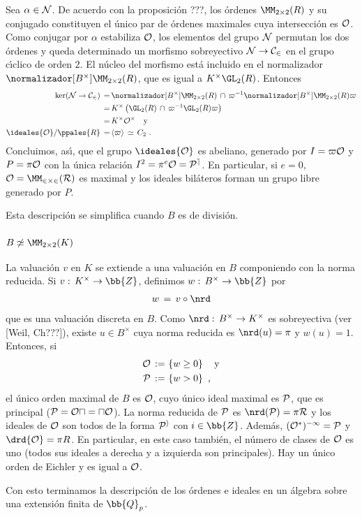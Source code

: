 Sea $\alpha\in\cal{N}$. De acuerdo con la proposici\'{o}n
???, los \'{o}rdenes $\MM_{2\times 2}(R)$ y su conjugado constituyen el
\'{u}nico par de \'{o}rdenes maximales cuya intersecci\'{o}n es $\cal{O}$.
Como conjugar por $\alpha$ estabiliza $\cal{O}$, los elementos del grupo
$\cal{N}$ permutan los dos \'{o}rdenes y queda determinado un morfismo
sobreyectivo $\cal{N}\rightarrow C_{2}$ en el grupo c\'{\i}clico de orden
$2$. El n\'{u}cleo del morfismo est\'{a} incluido en el normalizador
$\normalizador[B^{\times}]{\MM_{2\times 2}(R)}$, que es igual a
$K^{\times}\GL_{2}(R)$. Entonces
\begin{align*}
 \ker(\cal{N}\rightarrow C_{2}) \,=\, &
	\normalizador[B^{\times}]{\MM_{2\times 2}(R)}\,\cap\,
	\varpi^{-1}\normalizador[B^{\times}]{\MM_{2\times 2}(R)}\varpi \\
 \,=\, & K^{\times}
	\left(\GL_{2}(R)\,\cap\,\varpi^{-1}\GL_{2}(R)\varpi\right) \\
 \,=\, & K^{\times}\cal{O}^{\times}
	\quad\text{y} \\
	\ideales{\cal{O}}/\ppales{R}\,=\, & \langle\varpi\rangle\,\simeq\,
	C_{2}
	\text{ .}
\end{align*}
%
Concluimos, as\'{\i}, que el grupo $\ideales{\cal{O}}$ es abeliano,
generado por $I=\varpi\cal{O}$ y $P=\pi\cal{O}$ con la \'{u}nica relaci\'{o}n
$I^{2}=\pi^{e}\cal{O}=P^{e}$. En particular, si $e=0$,
$\cal{O}=\MM_{2\times 2}(R)$ es maximal y los ideales bil\'{a}teros
forman un grupo libre generado por $P$.

Esta descripci\'{o}n se simplifica cuando $B$ es de divisi\'{o}n.

\subsubsection{$B\not\simeq\MM_{2\times 2}(K)$}
La valuaci\'{o}n $v$ en $K$ se extiende a una valuaci\'{o}n en $B$
componiendo con la norma reducida. Si $v:\,K^{\times}\rightarrow\bb{Z}$,
definimos $w:\,B^{\times}\rightarrow\bb{Z}$ por
\begin{align*}
	w\,=\,v\circ\nrd
\end{align*}
%
que es una valuaci\'{o}n discreta en $B$. Como
$\nrd:\,B^{\times}\rightarrow K^{\times}$ es sobreyectiva (ver [Weil, Ch???]),
existe $u\in B^{\times}$ cuya norma reducida es $\nrd(u)=\pi$ y
$w(u)=1$. Entonces, si
\begin{align*}
	\cal{O}\,:=\, & \left\lbrace w\geq 0\right\rbrace\quad\text{y}\\
	\cal{P}\,:=\, & \left\lbrace w>0 \right\rbrace\text{ ,}
\end{align*}
%
el \'{u}nico orden maximal de $B$ es $\cal{O}$, cuyo \'{u}nico ideal
maximal es $\cal{P}$, que es principal ($\cal{P}=\cal{O}u=u\cal{O}$).
La norma reducida de $\cal{P}$ es $\nrd(\cal{P})=\pi R$ y los ideales
de $\cal{O}$ son todos de la forma $\cal{P}^{i}$ con $i\in\bb{Z}$.
Adem\'{a}s, $(\cal{O}^{*})^{-1}=\cal{P}$ y $\drd{\cal{O}}=\pi R$.
En particular, en este caso tambi\'{e}n, el n\'{u}mero de clases de $\cal{O}$
es uno (todos sus ideales a derecha y a izquierda son principales).
Hay un \'{u}nico orden de Eichler y es igual a $\cal{O}$.

Con esto terminamos la descripci\'{o}n de los \'{o}rdenes e ideales en
un \'{a}lgebra sobre una extensi\'{o}n finita de $\bb{Q}_{p}$.
